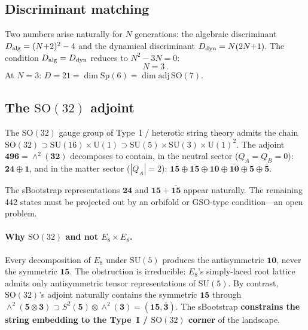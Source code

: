 \documentclass[12pt,a4paper]{article}
\newcommand{\SU}{\mathrm{SU}}
\newcommand{\UU}{\mathrm{U}}
\newcommand{\SO}{\mathrm{SO}}
\newcommand{\Sp}{\mathrm{Sp}}
\newcommand{\adj}{\mathrm{adj}}
\begin{document}
\subsection{Discriminant matching}

Two numbers arise naturally for $N$ generations:
the algebraic discriminant $D_{\rm alg} = (N{+}2)^2 - 4$
and the dynamical discriminant $D_{\rm dyn} = N(2N{+}1)$.
The condition $D_{\rm alg} = D_{\rm dyn}$ reduces to
$N^2 - 3N = 0$:
\begin{equation}
  \boxed{N = 3\,.}
  \label{eq:N3}
\end{equation}
At $N = 3$: $D = 21 = \dim \Sp(6) = \dim \adj\,\SO(7)$.

\subsection{The $\SO(32)$ adjoint}

The $\SO(32)$ gauge group of Type~I / heterotic string theory
admits the chain
$\SO(32) \supset \SU(16) \times \UU(1)
\supset \SU(5) \times \SU(3) \times \UU(1)^2$.
The adjoint $\mathbf{496} = \wedge^2(\mathbf{32})$ decomposes
to contain, in the neutral sector ($Q_A = Q_B = 0$):
$\mathbf{24} \oplus \mathbf{1}$, and in the matter sector
($|Q_A| = 2$):
$\mathbf{15} \oplus \overline{\mathbf{15}}
\oplus \mathbf{10} \oplus \overline{\mathbf{10}}
\oplus \mathbf{5} \oplus \bar{\mathbf{5}}$.

The sBootstrap representations $\mathbf{24}$ and
$\mathbf{15} + \overline{\mathbf{15}}$ appear naturally.
The remaining 442 states must be projected out by an
orbifold or GSO-type condition---an open problem.

\paragraph{Why $\SO(32)$ and not $E_8 \times E_8$.}
Every decomposition of $E_8$ under $\SU(5)$ produces the
antisymmetric $\mathbf{10}$, never the symmetric $\mathbf{15}$.
The obstruction is irreducible: $E_8$'s simply-laced root lattice
admits only antisymmetric tensor representations of $\SU(5)$.
By contrast, $\SO(32)$'s adjoint naturally contains the symmetric
$\mathbf{15}$ through
$\wedge^2(\mathbf{5} \otimes \mathbf{3})
\supset S^2(\mathbf{5}) \otimes \wedge^2(\mathbf{3})
= (\mathbf{15}, \bar{\mathbf{3}})$.
The sBootstrap \textbf{constrains the string embedding to the
Type~I / $\SO(32)$ corner} of the landscape.


\end{document}
